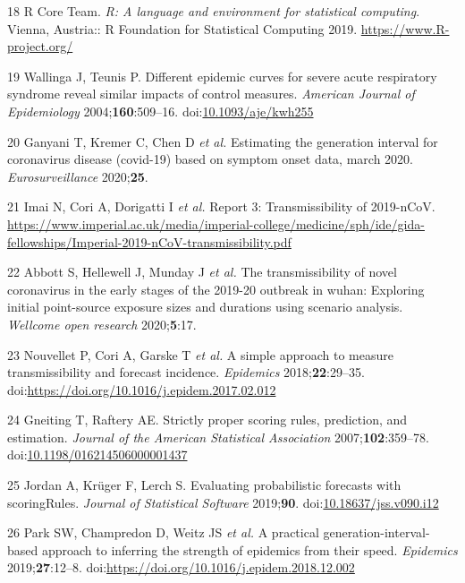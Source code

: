 \documentclass[]{article}
\begin{document}
\leavevmode\hypertarget{ref-R}{}%
18 R Core Team. \emph{R: A language and environment for statistical
computing}. Vienna, Austria:: R Foundation for Statistical Computing
2019. \url{https://www.R-project.org/}

\leavevmode\hypertarget{ref-wallinga2004}{}%
19 Wallinga J, Teunis P. Different epidemic curves for severe acute
respiratory syndrome reveal similar impacts of control measures.
\emph{American Journal of Epidemiology} 2004;\textbf{160}:509--16.
doi:\href{https://doi.org/10.1093/aje/kwh255}{10.1093/aje/kwh255}

\leavevmode\hypertarget{ref-generationinterval}{}%
20 Ganyani T, Kremer C, Chen D \emph{et al.} Estimating the generation
interval for coronavirus disease (covid-19) based on symptom onset data,
march 2020. \emph{Eurosurveillance} 2020;\textbf{25}.

\leavevmode\hypertarget{ref-Imai:webreport3}{}%
21 Imai N, Cori A, Dorigatti I \emph{et al.} Report 3: Transmissibility
of 2019-nCoV.
\url{https://www.imperial.ac.uk/media/imperial-college/medicine/sph/ide/gida-fellowships/Imperial-2019-nCoV-transmissibility.pdf}

\leavevmode\hypertarget{ref-Abbott:2020hj}{}%
22 Abbott S, Hellewell J, Munday J \emph{et al.} The transmissibility of
novel coronavirus in the early stages of the 2019-20 outbreak in wuhan:
Exploring initial point-source exposure sizes and durations using
scenario analysis. \emph{Wellcome open research} 2020;\textbf{5}:17.

\leavevmode\hypertarget{ref-NOUVELLET201829}{}%
23 Nouvellet P, Cori A, Garske T \emph{et al.} A simple approach to
measure transmissibility and forecast incidence. \emph{Epidemics}
2018;\textbf{22}:29--35.
doi:\href{https://doi.org/https://doi.org/10.1016/j.epidem.2017.02.012}{https://doi.org/10.1016/j.epidem.2017.02.012}

\leavevmode\hypertarget{ref-gneiting_strictly_2007}{}%
24 Gneiting T, Raftery AE. Strictly proper scoring rules, prediction,
and estimation. \emph{Journal of the American Statistical Association}
2007;\textbf{102}:359--78.
doi:\href{https://doi.org/10.1198/016214506000001437}{10.1198/016214506000001437}

\leavevmode\hypertarget{ref-jordan_evaluating_2019}{}%
25 Jordan A, Krüger F, Lerch S. Evaluating probabilistic forecasts with
scoringRules. \emph{Journal of Statistical Software} 2019;\textbf{90}.
doi:\href{https://doi.org/10.18637/jss.v090.i12}{10.18637/jss.v090.i12}

\leavevmode\hypertarget{ref-Park2019}{}%
26 Park SW, Champredon D, Weitz JS \emph{et al.} A practical
generation-interval-based approach to inferring the strength of
epidemics from their speed. \emph{Epidemics} 2019;\textbf{27}:12--8.
doi:\href{https://doi.org/https://doi.org/10.1016/j.epidem.2018.12.002}{https://doi.org/10.1016/j.epidem.2018.12.002}
\end{document}
